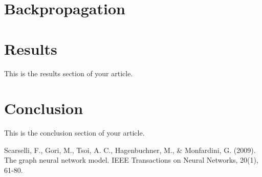 \documentclass[12pt]{article}
\begin{document}
\section{Backpropagation}
    

\section{Results}
This is the results section of your article.

\section{Conclusion}
This is the conclusion section of your article.

\begin{thebibliography}{9}
Scarselli, F., Gori, M., Tsoi, A. C., Hagenbuchner, M., \& Monfardini, G. (2009). The graph neural network model. IEEE Transactions on Neural Networks, 20(1), 61-80.

\end{thebibliography}
\end{document}
